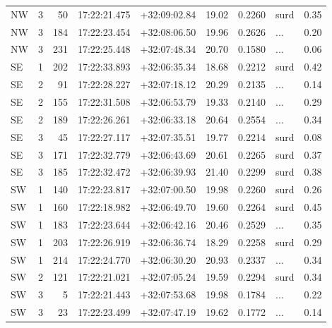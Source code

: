 \begin{tabular}{lrrllrrlr}
  NW &       3 &     50 &  17:22:21.475 &  +32:09:02.84 &  19.02 &    0.2260 &       surd &        0.35 \\
  NW &       3 &    184 &  17:22:23.454 &  +32:08:06.50 &  19.96 &    0.2626 &        ... &        0.20 \\
  NW &       3 &    231 &  17:22:25.448 &  +32:07:48.34 &  20.70 &    0.1580 &        ... &        0.06 \\
  SE &       1 &    202 &  17:22:33.893 &  +32:06:35.34 &  18.68 &    0.2212 &       surd &        0.42 \\
  SE &       2 &     91 &  17:22:28.227 &  +32:07:18.12 &  20.29 &    0.2135 &        ... &        0.14 \\
  SE &       2 &    155 &  17:22:31.508 &  +32:06:53.79 &  19.33 &    0.2140 &        ... &        0.29 \\
  SE &       2 &    189 &  17:22:26.261 &  +32:06:33.18 &  20.64 &    0.2554 &        ... &        0.34 \\
  SE &       3 &     45 &  17:22:27.117 &  +32:07:35.51 &  19.77 &    0.2214 &       surd &        0.08 \\
  SE &       3 &    171 &  17:22:32.779 &  +32:06:43.69 &  20.61 &    0.2265 &       surd &        0.37 \\
  SE &       3 &    185 &  17:22:32.472 &  +32:06:39.93 &  21.40 &    0.2299 &       surd &        0.38 \\
  SW &       1 &    140 &  17:22:23.817 &  +32:07:00.50 &  19.98 &    0.2260 &       surd &        0.26 \\
  SW &       1 &    160 &  17:22:18.982 &  +32:06:49.70 &  19.60 &    0.2264 &       surd &        0.45 \\
  SW &       1 &    183 &  17:22:23.644 &  +32:06:42.16 &  20.46 &    0.2529 &        ... &        0.35 \\
  SW &       1 &    203 &  17:22:26.919 &  +32:06:36.74 &  18.29 &    0.2258 &       surd &        0.29 \\
  SW &       1 &    214 &  17:22:24.770 &  +32:06:30.20 &  20.93 &    0.2337 &        ... &        0.34 \\
  SW &       2 &    121 &  17:22:21.021 &  +32:07:05.24 &  19.59 &    0.2294 &       surd &        0.34 \\
  SW &       3 &      5 &  17:22:21.443 &  +32:07:53.68 &  19.98 &    0.1784 &        ... &        0.22 \\
  SW &       3 &     23 &  17:22:23.499 &  +32:07:47.19 &  19.62 &    0.1772 &        ... &        0.14 \\

\end{tabular}
